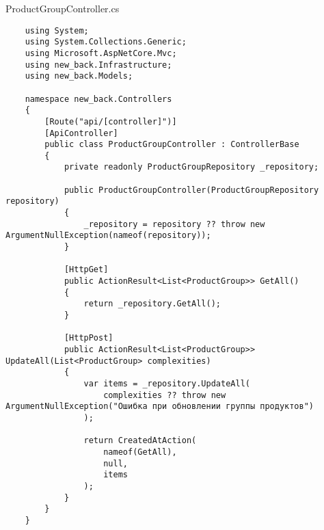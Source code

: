 ProductGroupController.cs
\lstset{style=sharpc}
\begin{lstlisting}
    using System;
    using System.Collections.Generic;
    using Microsoft.AspNetCore.Mvc;
    using new_back.Infrastructure;
    using new_back.Models;
    
    namespace new_back.Controllers
    {
        [Route("api/[controller]")]
        [ApiController]
        public class ProductGroupController : ControllerBase
        {
            private readonly ProductGroupRepository _repository;
            
            public ProductGroupController(ProductGroupRepository repository)
            {
                _repository = repository ?? throw new ArgumentNullException(nameof(repository));
            }
            
            [HttpGet]
            public ActionResult<List<ProductGroup>> GetAll()
            {
                return _repository.GetAll();
            }
            
            [HttpPost]
            public ActionResult<List<ProductGroup>> UpdateAll(List<ProductGroup> complexities)
            {
                var items = _repository.UpdateAll(
                    complexities ?? throw new ArgumentNullException("Ошибка при обновлении группы продуктов")
                );
    
                return CreatedAtAction(
                    nameof(GetAll),
                    null,
                    items
                );
            }
        }
    }
\end{lstlisting}

